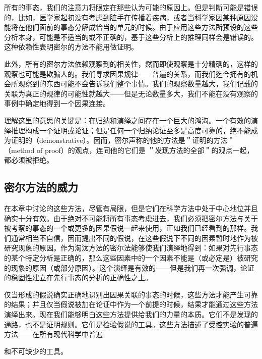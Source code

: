 所有的事态，我们的注意力将限定在那些认为可能的原因上。但是判断可能是错误的，比如，医学家起初没有考虑到脏手在传播着疾病，或者当科学家因某种原因没能将在他们面前的事态分解成恰当的单元的时候。由于应用这些方法所预设的这些分析本身，可能是不适当的或不正确的，基于这些分析上的推理同样会是错误的。这种依赖性表明密尔的方法不能用做证明。

此外，所有的密尔方法依赖观察到的相关性，然而即使观察是十分精确的，这样的观察也可能是欺骗人的。我们寻求因果规律——普遍的关系，而我们迄今拥有的机会所观察到的东西可能不会告诉我们整个事情。我们的观察数量越大，我们记载的关联为真正的规律的可能性就越大——但是无论数量多大，我们不能在没有观察的事例中确定地得到一个因果连接。

理解这里的意思的关键是：在归纳和演绎之间存在一个巨大的鸿沟。一个有效的演绎推理构成一个证明或论证；但是任何一个归纳论证至多是高度可靠的，绝不能成为证明的（demonstrative）。因而，密尔声称的他的方法是＂证明的方法＂（method of proof）的观点，连同他的它们是 ＂发现方法的全部＂的观点一起，都必须被拒绝。

\subsection{密尔方法的威力}
在本章中讨论的这些方法，尽管有局限，但是它们在科学方法中处于中心地位并且确实十分有效。由于绝对不可能将所有事态考虑进去，我们必须把密尔方法与关于被考察的事态的一个或更多的因果假说一起来使用，正如我们已经看到的那样。我们通常相当不自信，因而提出不同的假说，在这些假说下不同的因素暂时地作为被研究现象的原因。作为淘汰方法的密尔法能够使我们演绎地得到：如果对先行事态的某个特定分析是正确的，那么这些因素中的一个因素不能是（或必定是）被研究的现象的原因（或部分原因）。这个演绎是有效的——但是我们再一次强调，论证的稳固性建立在先行事态的分析的正确性之上。

仅当形成的假说确实正确地识别出因果关联的事态的时候，这些方法才能产生可靠的结果；并且仅当假说被加在论证中作为一个前提的时候，结果才能通过这些方法演绎出来。现在我们能够明白这些方法提供给我们的力量的本质。它们不是发现的通路，也不是证明规则。它们是检验假说的工具。这些方法描述了受控实验的普遍方法——在所有现代科学中普遍

和不可缺少的工具。 

